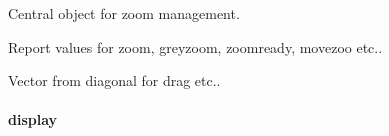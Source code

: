 \documentclass[letterpaper,10pt,openany,oneside]{sphinxmanual}
\begin{document}
\begin{fulllineitems}
\label{rst/visu2d:Visu.paramzoom.PARAM_ZOOM}
Central object for zoom management.

\begin{fulllineitems}
\label{rst/visu2d:Visu.paramzoom.PARAM_ZOOM.report}
Report values for zoom, greyzoom, zoomready, movezoo etc..

\end{fulllineitems}


\begin{fulllineitems}
\label{rst/visu2d:Visu.paramzoom.PARAM_ZOOM.zoom_diag_vector}
Vector from diagonal for drag etc..

\end{fulllineitems}


\end{fulllineitems}



\paragraph{display}
\label{rst/visu2d:module-Visu.display}\label{rst/visu2d:display}
\end{document}
